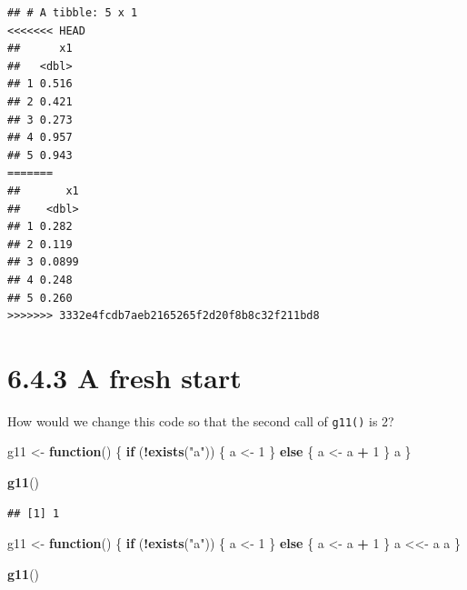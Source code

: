 \documentclass[]{book}
\newenvironment{Shaded}{\begin{snugshade}}{\end{snugshade}}
\newcommand{\ControlFlowTok}[1]{\textcolor[rgb]{0.13,0.29,0.53}{\textbf{#1}}}
\newcommand{\DecValTok}[1]{\textcolor[rgb]{0.00,0.00,0.81}{#1}}
\newcommand{\KeywordTok}[1]{\textcolor[rgb]{0.13,0.29,0.53}{\textbf{#1}}}
\newcommand{\NormalTok}[1]{#1}
\newcommand{\OperatorTok}[1]{\textcolor[rgb]{0.81,0.36,0.00}{\textbf{#1}}}
\newcommand{\StringTok}[1]{\textcolor[rgb]{0.31,0.60,0.02}{#1}}
\begin{document}
\begin{verbatim}
## # A tibble: 5 x 1
<<<<<<< HEAD
##      x1
##   <dbl>
## 1 0.516
## 2 0.421
## 3 0.273
## 4 0.957
## 5 0.943
=======
##       x1
##    <dbl>
## 1 0.282 
## 2 0.119 
## 3 0.0899
## 4 0.248 
## 5 0.260
>>>>>>> 3332e4fcdb7aeb2165265f2d20f8b8c32f211bd8
\end{verbatim}

\hypertarget{a-fresh-start}{%
\section*{6.4.3 A fresh start}\label{a-fresh-start}}

How would we change this code so that the second call of \texttt{g11()} is 2?

\begin{Shaded}
\begin{Highlighting}[]
\NormalTok{g11 <-}\StringTok{ }\ControlFlowTok{function}\NormalTok{() \{}
  \ControlFlowTok{if}\NormalTok{ (}\OperatorTok{!}\KeywordTok{exists}\NormalTok{(}\StringTok{"a"}\NormalTok{)) \{}
\NormalTok{    a <-}\StringTok{ }\DecValTok{1}
\NormalTok{  \} }\ControlFlowTok{else}\NormalTok{ \{}
\NormalTok{    a <-}\StringTok{ }\NormalTok{a }\OperatorTok{+}\StringTok{ }\DecValTok{1}
\NormalTok{  \}}
\NormalTok{  a}
\NormalTok{\}}

\KeywordTok{g11}\NormalTok{()}
\end{Highlighting}
\end{Shaded}

\begin{verbatim}
## [1] 1
\end{verbatim}

\begin{Shaded}
\begin{Highlighting}[]
\NormalTok{g11 <-}\StringTok{ }\ControlFlowTok{function}\NormalTok{() \{}
  \ControlFlowTok{if}\NormalTok{ (}\OperatorTok{!}\KeywordTok{exists}\NormalTok{(}\StringTok{"a"}\NormalTok{)) \{}
\NormalTok{    a <-}\StringTok{ }\DecValTok{1}
\NormalTok{  \} }\ControlFlowTok{else}\NormalTok{ \{}
\NormalTok{    a <-}\StringTok{ }\NormalTok{a }\OperatorTok{+}\StringTok{ }\DecValTok{1}
\NormalTok{  \}}
\NormalTok{  a <<-}\StringTok{ }\NormalTok{a}
\NormalTok{  a}
\NormalTok{\}}

\KeywordTok{g11}\NormalTok{()}
\end{Highlighting}
\end{Shaded}
\end{document}
